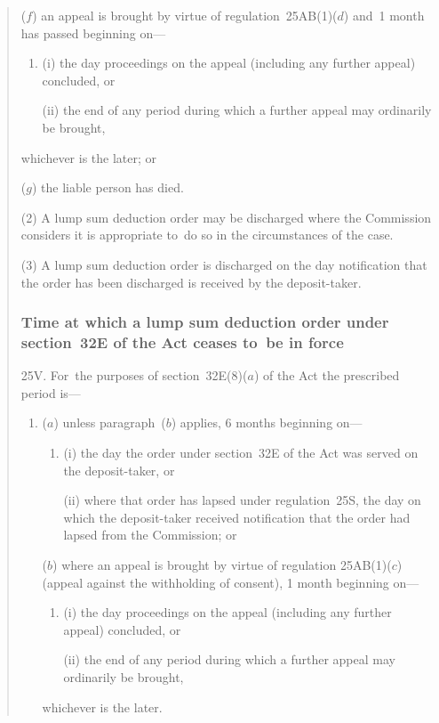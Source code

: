 \documentclass[12pt,a4paper]{article}
\begin{document}
\begin{quotation}
\begin{enumerate}
($f$) an appeal is brought by virtue of regulation~25AB(1)($d$)  and~1 month has passed beginning on—
\begin{enumerate}\item[]
(i) the day proceedings on the appeal (including any further appeal) concluded, or

(ii) the end of any period during which a further appeal may ordinarily be brought,
\end{enumerate}
whichever is the later; or

($g$) the liable person has died.
\end{enumerate}

(2) A lump sum deduction order may be discharged where the Commission considers it is appropriate to~do so in the circumstances of the case.

(3) A lump sum deduction order is discharged on the day notification that the order has been discharged is received by the deposit-taker.

\subsubsection*{Time at which a lump sum deduction order under section~32E of the Act ceases to~be in force}

25V.  For~the purposes of section~32E(8)($a$)  of the Act the prescribed period is—
\begin{enumerate}\item[]
($a$) unless paragraph~($b$)  applies, 6 months beginning on—
\begin{enumerate}\item[]
(i) the day the order under section~32E of the Act was served on the deposit-taker, or

(ii) where that order has lapsed under regulation~25S, the day on which the deposit-taker received notification that the order had lapsed from the Commission; or
\end{enumerate}

\begin{sloppypar}
($b$) where an appeal is brought by virtue of regulation 25AB(1)($c$)  (appeal against the withholding of consent), 1 month beginning on—
\end{sloppypar}
\begin{enumerate}\item[]
(i) the day proceedings on the appeal (including any further appeal) concluded, or

(ii) the end of any period during which a further appeal may ordinarily be brought,
\end{enumerate}
whichever is the later.
\end{enumerate}


\end{quotation}
\end{document}
